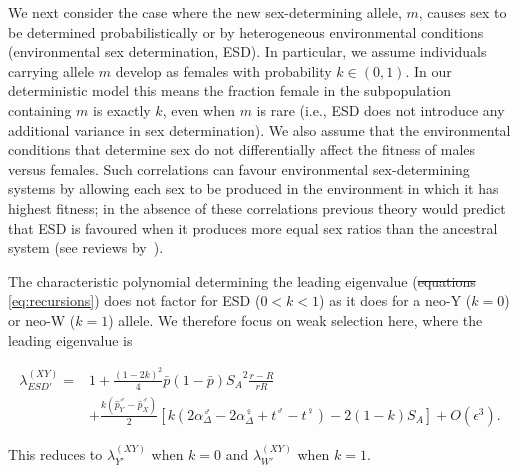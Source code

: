 \documentclass[10pt,letterpaper]{article}
\providecommand{\DIFadd}[1]{{\protect\color{blue}\uwave{#1}}} %
\providecommand{\DIFdel}[1]{{\protect\color{red}\sout{#1}}}                      %
\providecommand{\DIFaddbegin}{} %
\providecommand{\DIFaddend}{} %
\providecommand{\DIFdelbegin}{} %
\providecommand{\DIFdelend}{} %
\begin{document}
We next consider the case where the new sex-determining allele, $m$, causes sex to be determined probabilistically or by heterogeneous environmental conditions (environmental sex determination, ESD).
In particular, we assume individuals carrying allele $m$ develop as females with probability $k\in(0,1)$.
In our deterministic model this means the fraction female in the subpopulation containing $m$ is exactly $k$, even when $m$ is rare (i.e., ESD does not introduce any additional variance in sex determination). 
We also assume that the environmental conditions that determine sex do not differentially affect the fitness of males versus females. 
Such correlations can favour environmental sex-determining systems by allowing each sex to be produced in the environment in which it has highest fitness; in the absence of these correlations previous theory would predict that ESD is favoured when it produces more equal sex ratios than the ancestral system (see reviews by~\cite{Charnov:1982wg,Bull:1983vi,West:2009we}). 

The characteristic polynomial determining the leading eigenvalue (\DIFdelbegin \DIFdel{equations }\DIFdelend \DIFaddbegin \DIFadd{Eqs }\DIFaddend \ref{eq:recursions}) does not factor for ESD ($0<k<1$) as it does for a neo-Y ($k=0$) or neo-W ($k=1$) allele. 
We therefore focus on weak selection here, where the leading eigenvalue is

\begin{equation}
\begin{split}
\lambda_{ESD'}^{(XY)} =& 1 + \frac{{(1-2k)}^2}{4}\bar{p}(1-\bar{p}){S_{A}}^2\frac{r-R}{r R} \\
&+\frac{k(\hat{p}^\male_Y-\hat{p}^\male_X)}{2}\left[ k \left(2\alpha_{\Delta}^\male-2\alpha_{\Delta}^\female+t^\male-t^\female \right) -2(1-k)S_{A}\right]+O\left(\epsilon^3\right).
\end{split}
\label{eq:lambda_ESD_k}
\end{equation}

\noindent
This reduces to $\lambda_{Y'}^{(XY)}$ when $k=0$ and $\lambda_{W'}^{(XY)}$ when $k=1$. 
\DIFdelbegin %
\end{document}
